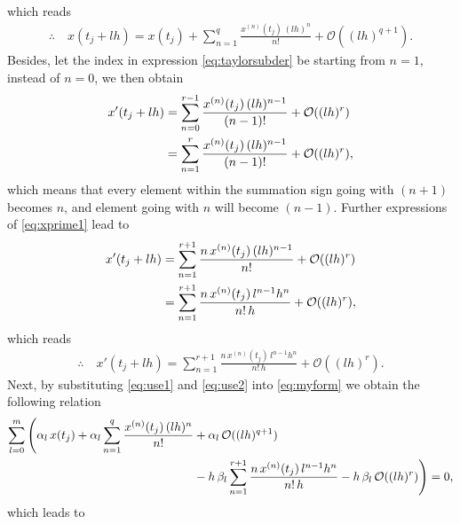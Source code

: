 \documentclass[12pt]{article}
\begin{document}
which reads 
\begin{align}
	\label{eq:use1}
	\therefore\quad\boxed{
	x(t_j+lh) = x(t_j) + \sum_{n=1}^{q} \frac{x^{(n)}(t_j)\,(lh)^{n}}{n!} + \mathcal{O}((lh)^{q+1}).
	}
\end{align}
Besides, let the index in expression \eqref{eq:taylorsubder}
be starting from $n=1$, instead of $n=0$, we then obtain
\begin{align}
	\label{eq:xprime1}
	x'(t_j+lh) 
	 & = \sum_{n=0}^{r-1} \frac{x^{(n)}(t_j)\,(lh)^{n-1}}{(n-1)!} + \mathcal{O}((lh)^{r}) \notag \\
	 & = \sum_{n=1}^{r} \frac{x^{(n)}(t_j)\,(lh)^{n-1}}{(n-1)!} + \mathcal{O}((lh)^{r}),
\end{align}
which means that every element within the summation sign going with $(n+1)$ becomes $n$, and 
element going with $n$ will become $(n-1)$. Further expressions of 
\eqref{eq:xprime1} lead to
\begin{align}
	\label{eq:xprime2}
	x'(t_j+lh) 
	 & = \sum_{n=1}^{r+1} \frac{n\,x^{(n)}(t_j)\,(lh)^{n-1}}{n!} + \mathcal{O}((lh)^{r}) \notag \\
	 & = \sum_{n=1}^{r+1} \frac{n\,x^{(n)}(t_j)\,l^{n-1}h^{n}}{n!\,h} + \mathcal{O}((lh)^{r}),
\end{align}
which reads 
\begin{align}
	\label{eq:use2}
	\therefore\quad\boxed{
	x'(t_j+lh)  = \sum_{n=1}^{r+1} \frac{n\,x^{(n)}(t_j)\,l^{n-1}h^{n}}{n!\,h} + \mathcal{O}((lh)^{r}).
	}
\end{align}
Next, by substituting \eqref{eq:use1} and \eqref{eq:use2} into \eqref{eq:myform}
we obtain the following relation
\begin{align}
	\sum_{l=0}^{{m}}
	\Bigg( 
	\alpha_l\,x(t_j)
	+ \alpha_l\sum_{n=1}^{q} \frac{x^{(n)}(t_j)\,(lh)^{n}}{n!}
	 & + 
	\alpha_l\,\mathcal{O}((lh)^{q+1}) 
	\notag \\
	 & 
	- h\,\beta_l
	\sum_{n=1}^{r+1} \frac{n\,x^{(n)}(t_j)\,l^{n-1}h^{n}}{n!\,h} 
	- h\,\beta_l\, 
	\mathcal{O}((lh)^{r})
	\Bigg) 
	= 0,
\end{align}
which leads to 
\end{document}
